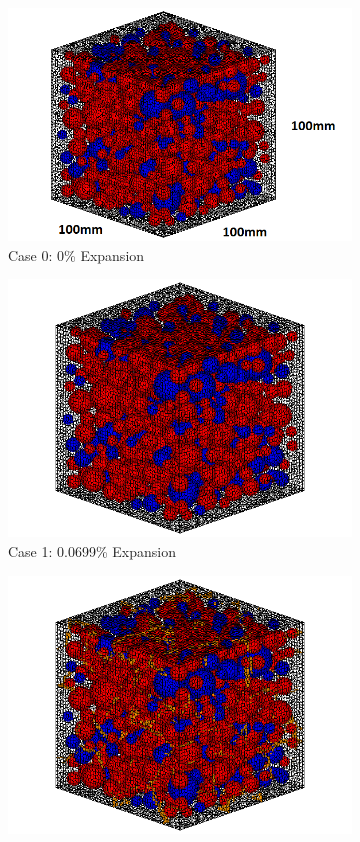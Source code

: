 \begin{figure}[!h]
\centering

    \begin{subfigure}{.5\textwidth}
      \centering
      \includegraphics[width=.8\linewidth]{Files/Aggregate/A30P75.png}
    \caption{Case 0: 0\% Expansion}
    \end{subfigure}%
    \begin{subfigure}{.5\textwidth}
      \centering
      \includegraphics[width=.8\linewidth]{Files/exp_3D/ASR/A30P75_1_c.png}
    \caption{Case 1: 0.0699\% Expansion}
    \end{subfigure}
    \begin{subfigure}{.5\textwidth}
      \centering
      \includegraphics[width=.8\linewidth]{Files/exp_3D/ASR/A30P75_2_c.png}

\end{subfigure}
\end{figure}
